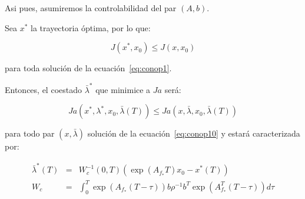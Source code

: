         Asi pues, asumiremos la controlabilidad del par $(A, b)$.

        Sea $x^*$ la trayectoria óptima, por lo que:

        \begin{equation*}
            J(x^*, x_0) \le J(x, x_0)
        \end{equation*}

        para toda solución de la ecuación~\ref{eq:conop1}.

        Entonces, el coestado $\bar{\lambda}^*$ que minimice a $Ja$ será:

        \begin{equation*}
            Ja(x^*, \lambda^*, x_0, \bar{\lambda}(T)) \le Ja(x, \bar{\lambda}, x_0, \bar{\lambda}(T))
        \end{equation*}

        para todo par $(x, \bar{\lambda})$ solución de la ecuación~\ref{eq:conop10} y estará caracterizada por:

        \begin{eqnarray*}
            \bar{\lambda}^*(T) & = & W_c^{-1}(0, T) \left( \exp{(A_{f_*} T)} x_0 - x^*(T) \right) \\
            W_c & = & \int_0^T \exp{\left( A_{f_*}(T-\tau) \right)} b \rho^{-1} b^T \exp{\left( A_{f_*}^T(T-\tau) \right)} d\tau
        \end{eqnarray*}

